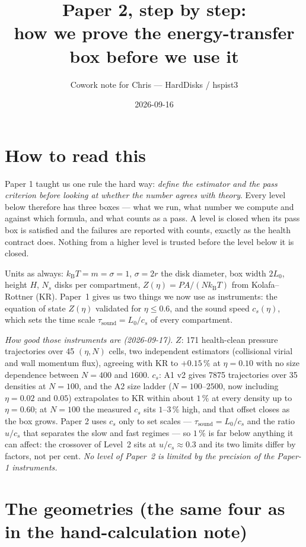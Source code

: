 \documentclass[11pt,a4paper]{article}
\title{Paper 2, step by step:\\ how we prove the energy-transfer box before we use it}
\author{Cowork note for Chris --- HardDisks / hspist3}
\date{2026-09-16}
\newcommand{\kT}{k_{\mathrm B}T}
\begin{document}
\maketitle

\section*{How to read this}
Paper 1 taught us one rule the hard way: \emph{define the estimator and the pass criterion before looking at whether the number agrees with theory}. Every level below therefore has three boxes --- what we run, what number we compute and against which formula, and what counts as a pass. A level is closed when its pass box is satisfied and the failures are reported with counts, exactly as the health contract does. Nothing from a higher level is trusted before the level below it is closed.

Units as always: $\kT = m = \sigma = 1$, $\sigma = 2r$ the disk diameter, box width $2L_0$, height $H$, $N_s$ disks per compartment, $Z(\eta) = PA/(N\kT)$ from Kolafa--Rottner (KR). Paper~1 gives us two things we now use as instruments: the equation of state $Z(\eta)$ validated for $\eta \le 0.6$, and the sound speed $c_s(\eta)$, which sets the time scale $\tau_{\mathrm{sound}} = L_0/c_s$ of every compartment.

\emph{How good those instruments are (2026-09-17).} $Z$: 171 health-clean pressure trajectories over 45 $(\eta,N)$ cells, two independent estimators (collisional virial and wall momentum flux), agreeing with KR to $+0.15\,\%$ at $\eta = 0.10$ with no size dependence between $N = 400$ and $1600$. $c_s$: A1 v2 gives 7875 trajectories over 35 densities at $N = 100$, and the A2 size ladder ($N = 100$--$2500$, now including $\eta = 0.02$ and $0.05$) extrapolates to KR within about $1\,\%$ at every density up to $\eta = 0.60$; at $N = 100$ the measured $c_s$ sits $1$--$3\,\%$ high, and that offset closes as the box grows. Paper 2 uses $c_s$ only to set scales --- $\tau_{\mathrm{sound}} = L_0/c_s$ and the ratio $u/c_s$ that separates the slow and fast regimes --- so $1\,\%$ is far below anything it can affect: the crossover of Level~2 sits at $u/c_s \approx 0.3$ and its two limits differ by factors, not per cent. \emph{No level of Paper~2 is limited by the precision of the Paper-1 instruments.}

\section{The geometries (the same four as in the hand-calculation note)}
\end{document}
